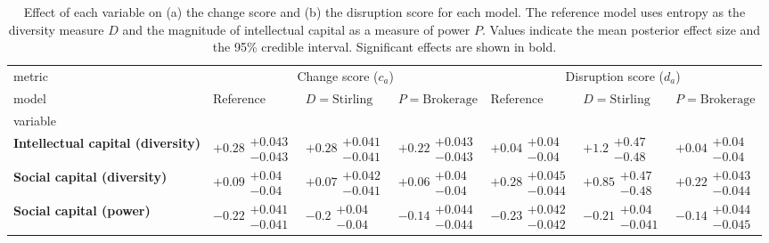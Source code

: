 \begin{table}[H]
\centering
\caption{Effect of each variable on (a) the change score and (b) the disruption score for each model. The reference model uses entropy as the diversity measure $D$ and the magnitude of intellectual capital as a measure of power $P$. Values indicate the mean posterior effect size and the 95\% credible interval. Significant effects are shown in bold.}
\label{table:summary_change_disruption}
\begin{tabular}{lllllll}
\toprule
metric & \multicolumn{3}{c}{Change score ($c_a$)} & \multicolumn{3}{c}{Disruption score ($d_a$)} \\
model &                                Reference &                      $D=\text{Stirling}$ &                     $P=\text{Brokerage}$ &                                Reference &                      $D=\text{Stirling}$ &                     $P=\text{Brokerage}$ \\
variable                                  &                                          &                                          &                                          &                                          &                                          &                                          \\
\midrule
\textbf{Intellectual capital (diversity)} &  $\bm{+0.28}\substack{+0.043 \\ -0.043}$ &  $\bm{+0.28}\substack{+0.041 \\ -0.041}$ &  $\bm{+0.22}\substack{+0.043 \\ -0.043}$ &    $\bm{+0.04}\substack{+0.04 \\ -0.04}$ &     $\bm{+1.2}\substack{+0.47 \\ -0.48}$ &         $+0.04\substack{+0.04 \\ -0.04}$ \\
\textbf{Social capital (diversity)}       &    $\bm{+0.09}\substack{+0.04 \\ -0.04}$ &  $\bm{+0.07}\substack{+0.042 \\ -0.041}$ &    $\bm{+0.06}\substack{+0.04 \\ -0.04}$ &  $\bm{+0.28}\substack{+0.045 \\ -0.044}$ &    $\bm{+0.85}\substack{+0.47 \\ -0.48}$ &  $\bm{+0.22}\substack{+0.043 \\ -0.044}$ \\
\textbf{Social capital (power)}           &  $\bm{-0.22}\substack{+0.041 \\ -0.041}$ &     $\bm{-0.2}\substack{+0.04 \\ -0.04}$ &  $\bm{-0.14}\substack{+0.044 \\ -0.044}$ &  $\bm{-0.23}\substack{+0.042 \\ -0.042}$ &   $\bm{-0.21}\substack{+0.04 \\ -0.041}$ &  $\bm{-0.14}\substack{+0.044 \\ -0.045}$ \\

\end{tabular}
\end{table}
